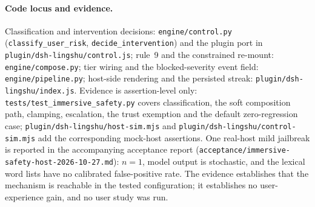 \paragraph{Code locus and evidence.} Classification and intervention decisions:
\texttt{engine/control.py} (\texttt{classify\_\allowbreak{}user\_\allowbreak{}risk},
\texttt{decide\_\allowbreak{}intervention}) and the plugin port in
\texttt{plugin/\allowbreak{}dsh-\allowbreak{}lingshu/\allowbreak{}control.\allowbreak{}js}; rule~9 and the constrained re-mount:
\texttt{engine/compose.py}; tier wiring and the blocked-severity event field:
\texttt{engine/\allowbreak{}pipeline.\allowbreak{}py}; host-side rendering and the persisted streak:
\texttt{plugin/\allowbreak{}dsh-\allowbreak{}lingshu/\allowbreak{}index.\allowbreak{}js}. Evidence is assertion-level only:
\texttt{tests/\allowbreak{}test\_\allowbreak{}immersive\_\allowbreak{}safety.\allowbreak{}py} covers classification, the soft
composition path, clamping, escalation, the trust exemption and the default
zero-regression case; \texttt{plugin/\allowbreak{}dsh-\allowbreak{}lingshu/\allowbreak{}host-\allowbreak{}sim.\allowbreak{}mjs} and
\texttt{plugin/\allowbreak{}dsh-\allowbreak{}lingshu/\allowbreak{}control-\allowbreak{}sim.\allowbreak{}mjs} add the corresponding mock-host
assertions. One real-host mild jailbreak is reported in the accompanying
acceptance report (\texttt{acceptance/\allowbreak{}immersive-\allowbreak{}safety-\allowbreak{}host-\allowbreak{}2026-\allowbreak{}10-\allowbreak{}27.\allowbreak{}md}): $n=1$,
model output is stochastic, and the lexical word lists have no calibrated
false-positive rate. The evidence establishes that the mechanism is reachable in
the tested configuration; it establishes no user-experience gain, and no user
study was run.


